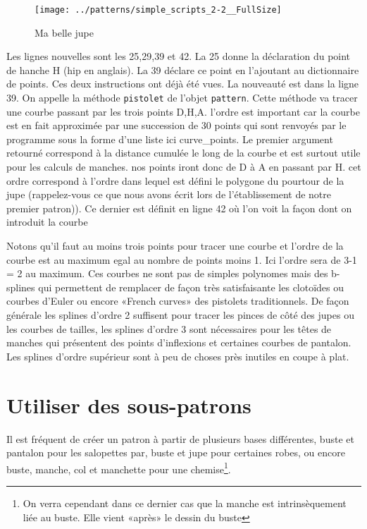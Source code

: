 \documentclass[10pt,a4paper,twoside]{report}
\begin{document}


\begin{figure}
\begin{center}
\texttt{[image: ../patterns/simple\_scripts\_2-2\_\_FullSize]}
\end{center}
\caption{Ma belle jupe}
\label{fig:trapeze}
\end{figure}

Les lignes nouvelles sont les 25,29,39 et 42. La 25 donne la déclaration du point de hanche H (hip en anglais). La 39 déclare ce point en l'ajoutant au dictionnaire de points. Ces deux instructions ont déjà été vues. La nouveauté est dans la ligne 39. On appelle la méthode \texttt{pistolet} de l'objet \texttt{pattern}. Cette méthode va tracer une courbe passant par les trois points D,H,A. l'ordre est important car la courbe est en fait approximée par une succession de 30 points qui sont renvoyés par le programme sous la forme d'une liste ici curve\_points. Le premier argument retourné correspond à la distance cumulée le long de la courbe et est surtout utile pour les calculs de manches. nos points iront donc de D à A en passant par H. cet ordre correspond à l'ordre dans lequel est défini le polygone du pourtour de la jupe (rappelez-vous ce que nous avons écrit lors de l'établissement de notre premier patron)). Ce dernier est définit en ligne 42 où l'on voit la façon dont on introduit la courbe

Notons qu'il faut au moins trois points pour tracer une courbe et l'ordre de la courbe est au maximum egal au nombre de points moins 1. Ici l'ordre sera de 3-1 = 2 au maximum. Ces courbes ne sont pas de simples polynomes mais des b-splines qui permettent de remplacer de façon très satisfaisante les clotoïdes ou courbes d'Euler ou encore «French curves» des pistolets traditionnels. De façon générale les splines d'ordre 2 suffisent pour tracer les pinces de côté des jupes ou les courbes de tailles, les splines d'ordre 3 sont nécessaires pour les têtes de manches qui présentent des points d'inflexions et certaines courbes de pantalon. Les splines d'ordre supérieur sont à peu de choses près inutiles en coupe à plat.




\section{Utiliser des sous-patrons}
Il est fréquent de créer un patron à partir de plusieurs bases différentes, buste et pantalon pour les salopettes par, buste et jupe pour certaines robes, ou encore buste, manche, col et manchette pour une chemise\footnote{On verra cependant dans ce dernier cas que la manche est intrinsèquement liée au buste. Elle vient «après» le dessin du buste}.
\end{document}
